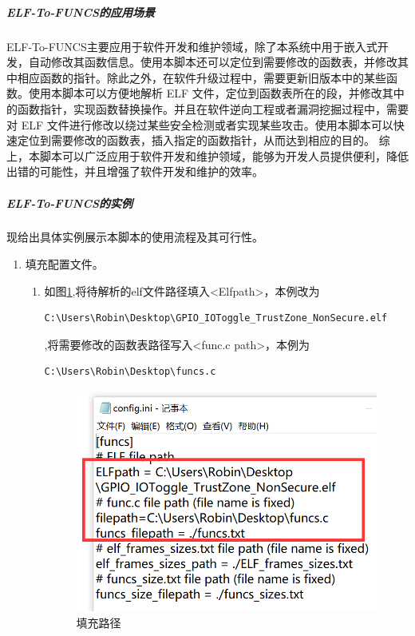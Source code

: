 \documentclass[12pt,a4paper]{ctexart}
\numberwithin{figure}{section}
\begin{document}
\subparagraph{ELF-To-FUNCS的应用场景}
\par ELF-To-FUNCS主要应用于软件开发和维护领域，除了本系统中用于嵌入式开发，自动修改其函数信息。使用本脚本还可以定位到需要修改的函数表，并修改其中相应函数的指针。除此之外，在软件升级过程中，需要更新旧版本中的某些函数。使用本脚本可以方便地解析 ELF 文件，定位到函数表所在的段，并修改其中的函数指针，实现函数替换操作。并且在软件逆向工程或者漏洞挖掘过程中，需要对 ELF 文件进行修改以绕过某些安全检测或者实现某些攻击。使用本脚本可以快速定位到需要修改的函数表，插入指定的函数指针，从而达到相应的目的。
综上，本脚本可以广泛应用于软件开发和维护领域，能够为开发人员提供便利，降低出错的可能性，并且增强了软件开发和维护的效率。
\subparagraph{ELF-To-FUNCS的实例}
\par 现给出具体实例展示本脚本的使用流程及其可行性。
\begin{enumerate}
    \item 填充配置文件。
    \begin{enumerate}
        \item 如图\ref{gl},将待解析的elf文件路径填入<Elfpath>，本例改为\begin{verbatim}C:\Users\Robin\Desktop\GPIO_IOToggle_TrustZone_NonSecure.elf\end{verbatim},将需要修改的函数表路径写入<func.c path>，本例为\begin{verbatim}C:\Users\Robin\Desktop\funcs.c\end{verbatim}
        \begin{figure}
            \centering
            \includegraphics[scale=0.4]{graph/gailujing.png}
            \caption{填充路径}
            \label{gl}
        \end{figure}

\end{enumerate}
\end{enumerate}
\end{document}

